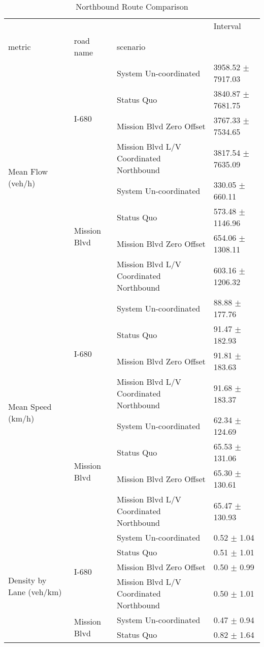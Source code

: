\begin{table}
\caption{Northbound Route Comparison}
\begin{tabular}{llll}
\toprule
 &  &  & Interval \\
metric & road name & scenario &  \\
\midrule
\multirow[t]{8}{*}{Mean Flow (veh/h)} & \multirow[t]{4}{*}{I-680} & System Un-coordinated & 3958.52 $\pm$ 7917.03 \\
 &  & Status Quo & 3840.87 $\pm$ 7681.75 \\
 &  & Mission Blvd Zero Offset & 3767.33 $\pm$ 7534.65 \\
 &  & Mission Blvd L/V Coordinated Northbound & 3817.54 $\pm$ 7635.09 \\
 & \multirow[t]{4}{*}{Mission Blvd} & System Un-coordinated & 330.05 $\pm$ 660.11 \\
 &  & Status Quo & 573.48 $\pm$ 1146.96 \\
 &  & Mission Blvd Zero Offset & 654.06 $\pm$ 1308.11 \\
 &  & Mission Blvd L/V Coordinated Northbound & 603.16 $\pm$ 1206.32 \\
\multirow[t]{8}{*}{Mean Speed (km/h)} & \multirow[t]{4}{*}{I-680} & System Un-coordinated & 88.88 $\pm$ 177.76 \\
 &  & Status Quo & 91.47 $\pm$ 182.93 \\
 &  & Mission Blvd Zero Offset & 91.81 $\pm$ 183.63 \\
 &  & Mission Blvd L/V Coordinated Northbound & 91.68 $\pm$ 183.37 \\
 & \multirow[t]{4}{*}{Mission Blvd} & System Un-coordinated & 62.34 $\pm$ 124.69 \\
 &  & Status Quo & 65.53 $\pm$ 131.06 \\
 &  & Mission Blvd Zero Offset & 65.30 $\pm$ 130.61 \\
 &  & Mission Blvd L/V Coordinated Northbound & 65.47 $\pm$ 130.93 \\
\multirow[t]{8}{*}{Density by Lane (veh/km)} & \multirow[t]{4}{*}{I-680} & System Un-coordinated & 0.52 $\pm$ 1.04 \\
 &  & Status Quo & 0.51 $\pm$ 1.01 \\
 &  & Mission Blvd Zero Offset & 0.50 $\pm$ 0.99 \\
 &  & Mission Blvd L/V Coordinated Northbound & 0.50 $\pm$ 1.01 \\
 & \multirow[t]{4}{*}{Mission Blvd} & System Un-coordinated & 0.47 $\pm$ 0.94 \\
 &  & Status Quo & 0.82 $\pm$ 1.64 \\

\end{tabular}
\end{table}
